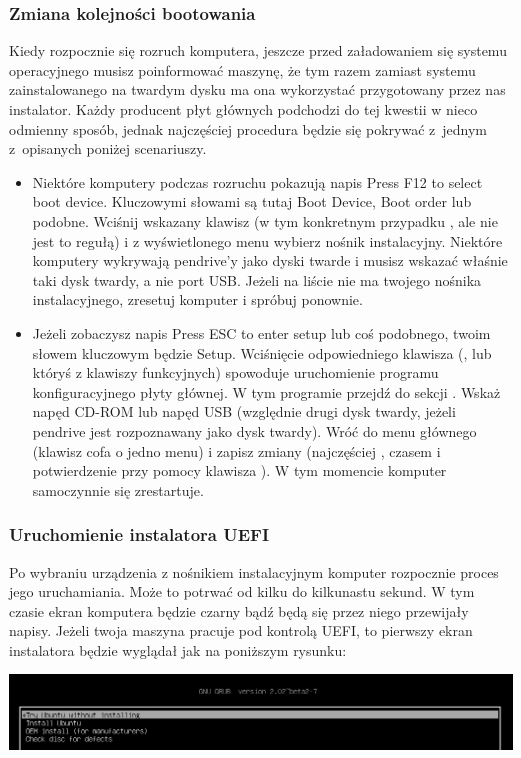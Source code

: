 \subsubsection{Zmiana kolejności bootowania}
Kiedy rozpocznie się rozruch komputera, jeszcze przed załadowaniem się systemu operacyjnego musisz poinformować maszynę, że tym razem zamiast systemu zainstalowanego na twardym dysku ma ona wykorzystać przygotowany przez nas instalator. Każdy producent płyt głównych podchodzi do tej kwestii w nieco odmienny sposób, jednak najczęściej procedura będzie się pokrywać z~jednym z~opisanych poniżej scenariuszy.
\begin{itemize}
\item Niektóre komputery podczas rozruchu pokazują napis \textcolor{ubuntu_orange}{Press F12 to select boot device}. Kluczowymi słowami są tutaj \textcolor{ubuntu_orange}{Boot Device}, \textcolor{ubuntu_orange}{Boot order} lub podobne. Wciśnij wskazany klawisz (w tym konkretnym przypadku , ale nie jest to regułą) i z wyświetlonego menu wybierz nośnik instalacyjny. Niektóre komputery wykrywają pendrive'y jako dyski twarde i musisz wskazać właśnie taki dysk twardy, a nie port USB. Jeżeli na liście nie ma twojego nośnika instalacyjnego, zresetuj komputer i spróbuj ponownie.
\item Jeżeli zobaczysz napis \textcolor{ubuntu_orange}{Press ESC to enter setup} lub coś podobnego, twoim słowem kluczowym będzie \textcolor{ubuntu_orange}{Setup}. Wciśnięcie odpowiedniego klawisza (\keys{\escwin}, \keys{\delwin} lub któryś z klawiszy funkcyjnych) spowoduje uruchomienie programu konfiguracyjnego płyty głównej. W tym programie przejdź do sekcji . Wskaż napęd CD-ROM lub napęd USB (względnie drugi dysk twardy, jeżeli pendrive jest rozpoznawany jako dysk twardy). Wróć do menu głównego (klawisz \keys{\escwin} cofa o jedno menu) i zapisz zmiany (najczęściej , czasem \keys{\escwin} i potwierdzenie przy pomocy klawisza ). W tym momencie komputer samoczynnie się zrestartuje.
\end{itemize}
\subsubsection{Uruchomienie instalatora UEFI}
\label{instalacja_uruchomienie_uefi}
Po wybraniu urządzenia z nośnikiem instalacyjnym komputer rozpocznie proces jego uruchamiania. Może to potrwać od kilku do kilkunastu sekund. W tym czasie ekran komputera będzie czarny bądź będą się przez niego przewijały napisy. Jeżeli twoja maszyna pracuje pod kontrolą UEFI, to pierwszy ekran instalatora będzie wyglądał jak na poniższym rysunku:
\begin{center}
        \includegraphics[width=\linewidth]{images/instalacja_UEFI_boot.png}
\end{center}

